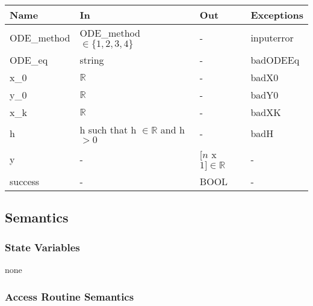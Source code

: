 \documentclass[12pt, titlepage]{article}
\begin{document}
\begin{center}
\begin{tabular}{p{4cm} p{4cm} p{4cm} p{2cm}}
\hline
\textbf{Name} & \textbf{In} & \textbf{Out} & \textbf{Exceptions} \\
\hline
ODE\_method & ODE\_method $\in \{1, 2, 3, 4\}$  & - &  inputerror\\
ODE\_eq & string & - & badODEEq\\
x\_0 & $\mathbb{R}$ & - & badX0\\
y\_0 & $\mathbb{R}$ & - & badY0\\
x\_k & $\mathbb{R}$ & - & badXK\\
h & h such that h $\in \mathbb{R}$ and h $> 0$ & - & badH\\
y & - & [$n$ x $1] \in \mathbb{R}$ & - \\
success & - & BOOL & - \\
\hline
\end{tabular}
\end{center}

\subsection{Semantics}

\subsubsection{State Variables}
none

\subsubsection{Access Routine Semantics}
\end{document}
